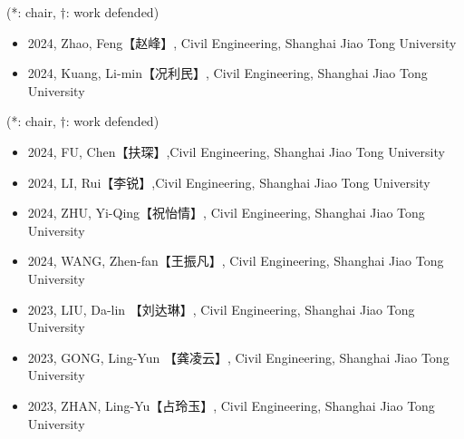 \documentclass[10pt]{article}
\newenvironment{myitemize}
{ \begin{itemize}
    \setlength{\itemsep}{0pt}
    \setlength{\parskip}{0pt}
    \setlength{\parsep}{0pt}     }
{ \end{itemize}                  }
\begin{document}

 (*: chair, $\dagger$: work defended)
\begin{myitemize}
\item 2024, Zhao, Feng【赵峰】, Civil Engineering, Shanghai Jiao Tong University 
\item 2024, Kuang, Li-min【况利民】, Civil Engineering, Shanghai Jiao Tong University 
\end{myitemize}
 (*: chair, $\dagger$: work defended)
\begin{myitemize}
\item 2024, FU, Chen【扶琛】,Civil Engineering, Shanghai Jiao Tong University
\item 2024, LI, Rui【李锐】,Civil Engineering, Shanghai Jiao Tong University
\item 2024, ZHU, Yi-Qing【祝怡情】, Civil Engineering, Shanghai Jiao Tong University
\item 2024, WANG, Zhen-fan【王振凡】, Civil Engineering, Shanghai Jiao Tong University
\item 2023, LIU, Da-lin 【刘达琳】, Civil Engineering, Shanghai Jiao Tong University 
\item 2023, GONG, Ling-Yun 【龚凌云】, Civil Engineering, Shanghai Jiao Tong University 
\item 2023, ZHAN, Ling-Yu【占玲玉】, Civil Engineering, Shanghai Jiao Tong University 
\end{myitemize}
\end{document}
